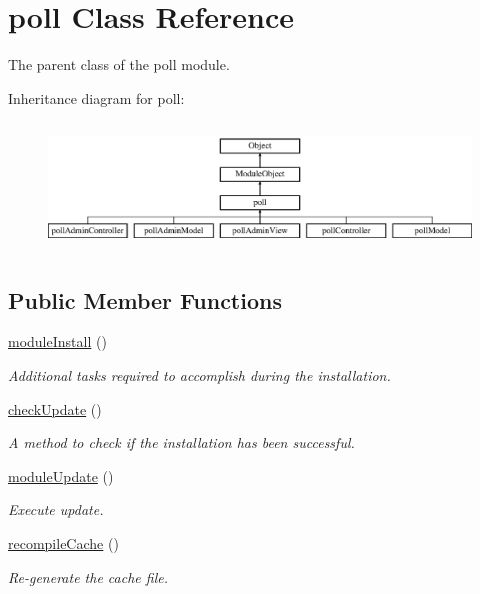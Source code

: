 \hypertarget{classpoll}{}\section{poll Class Reference}
\label{classpoll}


The parent class of the poll module.  


Inheritance diagram for poll\+:\begin{figure}[H]
\begin{center}
\leavevmode
\includegraphics[height=3.419847cm]{classpoll}
\end{center}
\end{figure}
\subsection*{Public Member Functions}
\begin{DoxyCompactItemize}
\item 
\hyperlink{classpoll_a21a07b0e65ffb1727542bb95a72386c9}{module\+Install} ()
\begin{DoxyCompactList}\small\item\em Additional tasks required to accomplish during the installation. \end{DoxyCompactList}\item 
\hyperlink{classpoll_a42546dbd4aeb7d1bc60a0353c5922f36}{check\+Update} ()
\begin{DoxyCompactList}\small\item\em A method to check if the installation has been successful. \end{DoxyCompactList}\item 
\hyperlink{classpoll_a3d8f63f173e74e8a19c61ee06f4ac02f}{module\+Update} ()
\begin{DoxyCompactList}\small\item\em Execute update. \end{DoxyCompactList}\item 
\hyperlink{classpoll_af1f9c058e0e622c4356cda133f9b988e}{recompile\+Cache} ()
\begin{DoxyCompactList}\small\item\em Re-\/generate the cache file. \end{DoxyCompactList}\end{DoxyCompactItemize}
